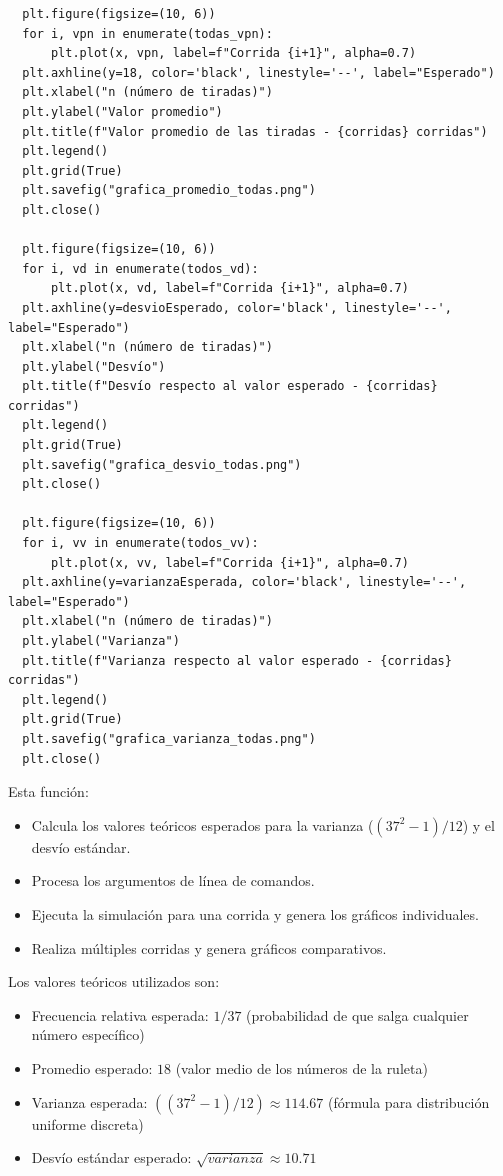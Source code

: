 \documentclass{article}
\begin{document}
\begin{verbatim}
  plt.figure(figsize=(10, 6))
  for i, vpn in enumerate(todas_vpn):
      plt.plot(x, vpn, label=f"Corrida {i+1}", alpha=0.7)
  plt.axhline(y=18, color='black', linestyle='--', label="Esperado")
  plt.xlabel("n (número de tiradas)")
  plt.ylabel("Valor promedio")
  plt.title(f"Valor promedio de las tiradas - {corridas} corridas")
  plt.legend()
  plt.grid(True)
  plt.savefig("grafica_promedio_todas.png")
  plt.close()
  
  plt.figure(figsize=(10, 6))
  for i, vd in enumerate(todos_vd):
      plt.plot(x, vd, label=f"Corrida {i+1}", alpha=0.7)
  plt.axhline(y=desvioEsperado, color='black', linestyle='--', label="Esperado")
  plt.xlabel("n (número de tiradas)")
  plt.ylabel("Desvío")
  plt.title(f"Desvío respecto al valor esperado - {corridas} corridas")
  plt.legend()
  plt.grid(True)
  plt.savefig("grafica_desvio_todas.png")
  plt.close()
  
  plt.figure(figsize=(10, 6))
  for i, vv in enumerate(todos_vv):
      plt.plot(x, vv, label=f"Corrida {i+1}", alpha=0.7)
  plt.axhline(y=varianzaEsperada, color='black', linestyle='--', label="Esperado")
  plt.xlabel("n (número de tiradas)")
  plt.ylabel("Varianza")
  plt.title(f"Varianza respecto al valor esperado - {corridas} corridas")
  plt.legend()
  plt.grid(True)
  plt.savefig("grafica_varianza_todas.png")
  plt.close()
\end{verbatim}

Esta función:
\begin{itemize}
    \item Calcula los valores teóricos esperados para la varianza ($(37^2-1)/12$) y el desvío estándar.
    \item Procesa los argumentos de línea de comandos.
    \item Ejecuta la simulación para una corrida y genera los gráficos individuales.
    \item Realiza múltiples corridas y genera gráficos comparativos.
\end{itemize}

Los valores teóricos utilizados son:
\begin{itemize}
    \item Frecuencia relativa esperada: $1/37$ (probabilidad de que salga cualquier número específico)
    \item Promedio esperado: $18$ (valor medio de los números de la ruleta)
    \item Varianza esperada: $((37^2-1)/12) \approx 114.67$ (fórmula para distribución uniforme discreta)
    \item Desvío estándar esperado: $\sqrt{varianza} \approx 10.71$
\end{itemize}
\end{document}
